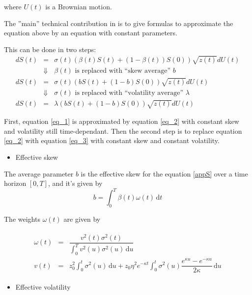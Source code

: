 \documentclass[12pt,a4paper]{article}
\begin{document}
where $U(t)$ is a Brownian motion.

The ''main'' technical contribution in \cite{Pit04} is to give formulas to approximate the equation above by an equation with constant parameters.

This can be done in two steps:
\begin{eqnarray}
\label{eq_1}
d S(t) &=& \sigma(t) \left( \beta(t) S(t) + (1-\beta(t))S(0)\right)  \sqrt{z(t)} dU(t)  \\
&\Downarrow& \beta(t) \text{ is replaced with ``skew average'' } b \nonumber\\
\label{eq_2}
d S(t) &=& \sigma(t) \left(b S(t) + (1-b)S(0)\right)  \sqrt{z(t)} dU(t) \\
&\Downarrow& \sigma(t) \text{ is replaced with ``volatility average'' } \nonumber\lambda\\
\label{eq_3}
d S(t) &=& \lambda \left( b S(t) + (1-b)S(0)\right)  \sqrt{z(t)} dU(t) 
\end{eqnarray}

First, equation \ref{eq_1} is approximated by equation \ref{eq_2} with constant skew and volatility still time-dependant. Then the second step is to replace equation \ref{eq_2} with equation \ref{eq_3} with constant skew and constant volatility.

\begin{itemize}
 \item Effective skew
\end{itemize}

The average parameter $b$ is the effective skew for the equation \ref{appS} over a time horizon $[0,T]$, and it's given by
$$b = \int_{0}^T \beta(t) \omega(t)\, \mathrm dt $$

The weights $\omega(t)$ are given by 

\begin{eqnarray*}
\begin{array}{rcl}
\omega(t) &=& \dfrac{v^2(t) \sigma^2(t)}{\int_{0}^T v^2(u) \sigma^2(u)\, \mathrm du} \\
v(t) &=& z_0^2 \int_{0}^t \sigma^2(u)\, \mathrm du + z_0 \eta^2e^{-\kappa t}\int_{0}^t \sigma^2(u) \dfrac{e^{\kappa u}-e^{-\kappa u}}{2 \kappa}\, \mathrm du
\end{array}
\end{eqnarray*}

\begin{itemize}
 \item Effective volatility
\end{itemize}
\end{document}
